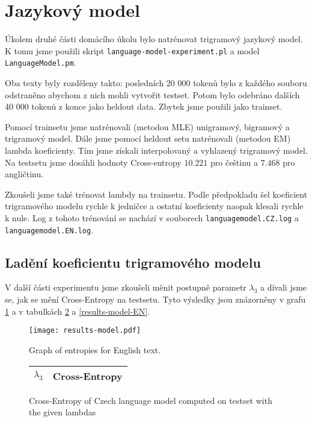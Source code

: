 \documentclass[11pt]{article}
\begin{document}
\section{Jazykový model}

Úkolem druhé části domácího úkolu bylo natrénovat trigramový jazykový model. K tomu jsme použili skript 
\texttt{language-model-experiment.pl} a model \texttt{LanguageModel.pm}. 

Oba texty byly rozděleny takto: posledních 20 000 tokenů bylo z každého souboru odstraněno abychom z nich mohli
vytvořit testset. Potom bylo odebráno dalších 40 000 tokenů z konce jako heldout data. Zbytek 
jsme použili jako trainset.

Pomocí trainsetu jsme natrénovali (metodou MLE) unigramový, bigramový a trigramový model. Dále jsme pomocí heldout
setu natrénovali (metodou EM) lambda koeficienty. Tím jsme získali interpolovaný a vyhlazený trigramový model.
Na testsetu jsme dosáhli hodnoty Cross-entropy $10.221$ pro češtinu a $7.468$ pro angličtinu.

Zkoušeli jsme také trénovat lambdy na trainsetu. Podle předpokladu šel koeficient trigramového modelu rychle k jedničce a ostatní
koeficienty naopak klesali rychle k nule. Log z tohoto trénování se nachází v souborech \texttt{languagemodel.CZ.log} a 
\texttt{languagemodel.EN.log}. 

\subsection{Ladění koeficientu trigramového modelu}

V další části experimentu jsme zkoušeli měnit postupně parametr $\lambda_3$ a dívali jsme se, jak se mění Cross-Entropy na testsetu. 
Tyto výsledky jsou znázorněny v grafu \ref{results-model} a v tabulkách \ref{results-model-CZ} a \ref{results-model-EN}.

\begin{figure}
    \texttt{[image: results-model.pdf]}
    \caption{Graph of entropies for English text.}
    \label{results-model}
\end{figure}

\begin{figure}
    \begin{center}
    \begin{tabular}{|l|c|}
        \hline
        $\lambda_3$ & Cross-Entropy \\
        \hline
        
        \hline
    \end{tabular}
    \end{center}
    \caption{Cross-Entropy of Czech language model computed on testset with the given lambdas}
    \label{results-model-CZ}
\end{figure}
\end{document}
